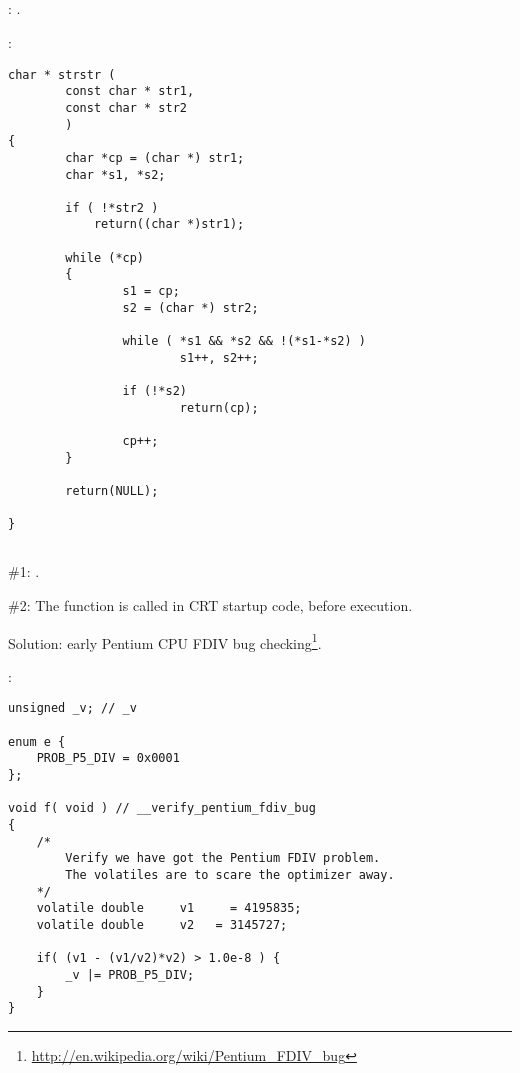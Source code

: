 \subsection{}

: .

:

\begin{lstlisting}
char * strstr (
        const char * str1,
        const char * str2
        )
{
        char *cp = (char *) str1;
        char *s1, *s2;

        if ( !*str2 )
            return((char *)str1);

        while (*cp)
        {
                s1 = cp;
                s2 = (char *) str2;

                while ( *s1 && *s2 && !(*s1-*s2) )
                        s1++, s2++;

                if (!*s2)
                        return(cp);

                cp++;
        }

        return(NULL);

}
\end{lstlisting}

\subsection{}

 \#1:  
\EMDASH{}.

 \#2: 
{The function is called in \ac{CRT} startup code, before \main execution}.

{Solution: early Pentium CPU FDIV bug checking}\footnote{\url{http://en.wikipedia.org/wiki/Pentium_FDIV_bug}}.

:

\begin{lstlisting}
unsigned _v; // _v

enum e {
    PROB_P5_DIV = 0x0001
};

void f( void ) // __verify_pentium_fdiv_bug
{
    /*
        Verify we have got the Pentium FDIV problem.
        The volatiles are to scare the optimizer away.
    */
    volatile double     v1     = 4195835;
    volatile double     v2   = 3145727;

    if( (v1 - (v1/v2)*v2) > 1.0e-8 ) {
        _v |= PROB_P5_DIV;
    }
}
\end{lstlisting}

